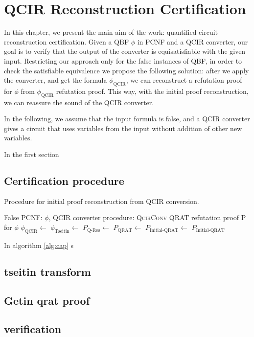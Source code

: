 \section{QCIR Reconstruction Certification}

In this chapter, we present the main aim of the work: quantified circuit reconstruction certification. Given a QBF $\phi$ in PCNF and a QCIR converter, our goal is to verify that the output of the converter is equisatisfiable with the given input. Restricting our approach only for the false instances of QBF, in order to check the satisfiable equivalence we propose the following solution: after we apply the converter, and get the formula $\phi_\text{QCIR}$, we can reconstruct a refutation proof for $\phi$ from $\phi_\text{QCIR}$ refutation proof. This way, with the initial proof reconstruction, we can reassure the sound of the QCIR converter.

In the following, we assume that the input formula is false, and a QCIR converter gives a circuit that uses variables from the input without addition of other new variables.

In the first section 

\subsection{Certification procedure}

\begin{algorithm}[H]
\caption{Procedure for initial proof reconstruction from QCIR conversion.}\label{alg:cap}
\begin{algorithmic}[1]
\Require False PCNF: $\phi$, QCIR converter procedure: \textsc{QcirConv}
\Ensure QRAT refutation proof P for $\phi$
\State $\phi_\text{QCIR} \gets$ 
\State $\phi_\text{Tseitin} \gets$ 
\State $P_\text{Q-Res} \gets$ 
\State $P_\text{QRAT} \gets$ 
\State $P_\text{Initial-QRAT} \gets$ 
\State \Return $P_\text{Initial-QRAT}$
\EndProcedure
\end{algorithmic}
\end{algorithm}

In algorithm \ref{alg:cap} s

\subsection{tseitin transform}
\subsection{Getin qrat proof}
\subsection{verification}